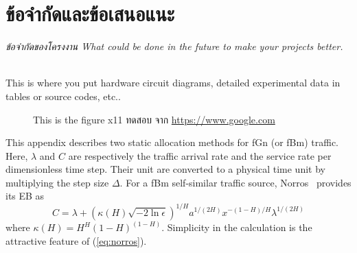 \documentclass[12pt,oneside,openright,a4paper]{cpe-thai-project}
\begin{document}
\section{ข้อจำกัดและข้อเสนอแนะ}
    \emph{
        ข้อจำกัดของโครงงาน What could be done in the future to make your projects better.
    }



\makeatletter
\g@addto@macro{\UrlBreaks}{\UrlOrds}
\makeatother
% 


 \\

    This is where you put hardware circuit diagrams, detailed experimental data in tables or source codes, etc.. \\ \bigskip

    \begin{figure}[!h]
        \caption{This is the figure x11 ทดสอบ จาก \href{https://www.google.com} {https://www.google.com}}\label{fig:x1}
    \end{figure}

This appendix describes two static allocation methods for fGn (or fBm)
traffic. Here, $\lambda$ and $C$ are respectively the traffic arrival
rate and the service rate per dimensionless time step. Their unit are
converted to a physical time unit by multiplying the step size
$\Delta$. For a fBm self-similar traffic source,
Norros~\cite{norros95} provides its EB as
\begin{equation}\label{eq:norros}
  C = \lambda + (\kappa(H)\sqrt{-2\ln\epsilon})^{1/H}a^{1/(2H)}x^{-(1-H)/H}\lambda^{1/(2H)}
\end{equation}
where $\kappa(H) = H^H(1-H)^{(1-H)}$. Simplicity in the calculation is
the attractive feature of (\ref{eq:norros}).
\end{document}
